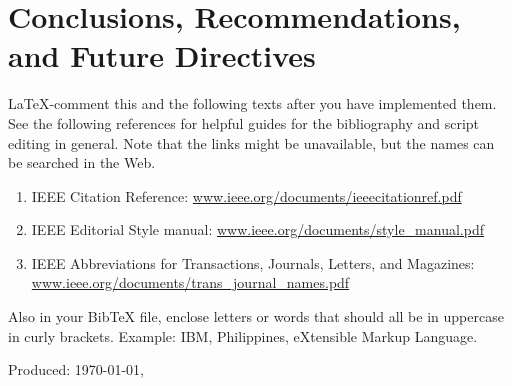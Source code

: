 \ifConc
	\chapter{Conclusions, Recommendations, and Future Directives} 
	\label{ch:conc} 
	\startcontents[chapters]
	\begin{SingleSpace}	
		\Mprintcontents 
	\end{SingleSpace}
	
	\stopcontents[chapters]
	\cleardoublepage
\fi

\renewcommand{\UrlFont}{\normalfont}
\begin{SingleSpace}
  {\small }
	\vfill
	\LaTeX-comment this and the following texts after you have implemented them. See the following references for helpful guides for the bibliography and script editing in general.  Note that the links might be unavailable, but the names can be searched in the Web.
		
	\begin{enumerate}
		\item IEEE Citation Reference: \url{www.ieee.org/documents/ieeecitationref.pdf}
		
		\item IEEE Editorial Style manual: \url{www.ieee.org/documents/style_manual.pdf} 
		
		\item IEEE Abbreviations for Transactions, Journals, Letters, and Magazines: \url{www.ieee.org/documents/trans_journal_names.pdf}
	\end{enumerate}
	
\noindent Also in your BibTeX file, enclose letters or words that should all be in uppercase in curly brackets. Example: {IBM}, {P}hilippines, e{X}tensible {M}arkup {L}anguage.

\end{SingleSpace}
\vfill
\begin{flushright}
Produced: \usdate\today, \currenttime \\
\end{flushright}
\cleardoublepage 

\SingleSpacing
\appendix
\renewcommand{\thechapter}{\Alph{chapter}}
\renewcommand{\thesection}{\thechapter\arabic{section}}
\appto\appendix{\renewcommand\thechapter{\AlphAlph{\value{chapter}}}} %

